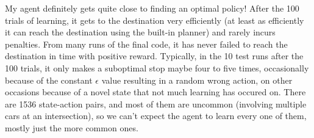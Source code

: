 \documentclass{amsart}
\begin{document}
My agent definitely gets quite close to finding an optimal policy!  After the 100 trials of learning, it gets to the destination very efficiently (at least as efficiently it can reach the destination using the built-in planner) and rarely incurs penalties.  From many runs of the final code, it has never failed to reach the destination in time with positive reward.  Typically, in the 10 test runs after the 100 trials, it only makes a suboptimal stop maybe four to five times, occasionally because of the constant $\epsilon$ value resulting in a random wrong action, on other occasions because of a novel state that not much learning has occured on.  There are 1536 state-action pairs, and most of them are uncommon (involving multiple cars at an intersection), so we can't expect the agent to learn every one of them, mostly just the more common ones.
\end{document}
